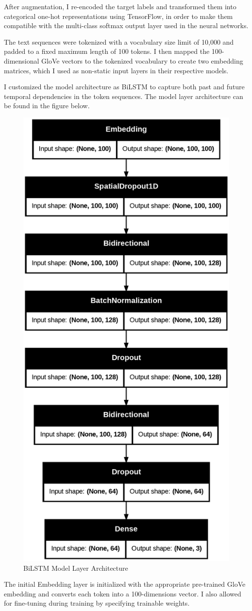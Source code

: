 After augmentation, I re-encoded the target labels and transformed them into categorical one-hot representations using TensorFlow, in order to make them compatible with the multi-class softmax output layer used in the neural networks.

The text sequences were tokenized with a vocabulary size limit of 10,000 and padded to a fixed maximum length of 100 tokens. I then mapped the 100-dimensional GloVe vectors to the tokenized vocabulary to create two embedding matrices, which I used as non-static input layers in their respective models.

I customized the model architecture as BiLSTM to capture both past and future temporal dependencies in the token sequences. The model layer architecture can be found in the figure below.

\begin{figure}
    \centering
    \includegraphics[width=0.5\linewidth]{img/model-architecture.png}
    \caption{BiLSTM Model Layer Architecture}
    \label{Fig_1}
\end{figure}

The initial Embedding layer is initialized with the appropriate pre-trained GloVe embedding and converts each token into a 100-dimensions vector. I also allowed for fine-tuning during training by specifying trainable weights.

